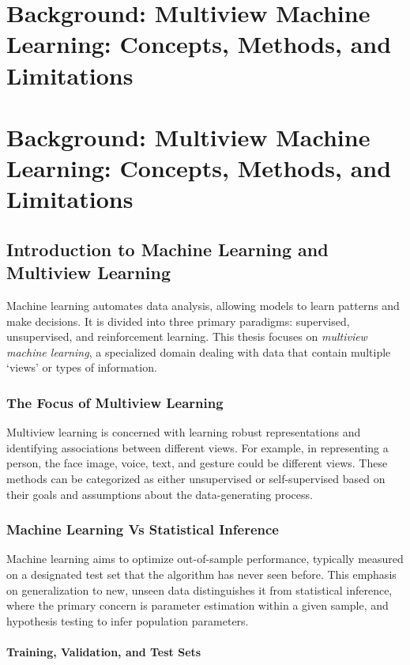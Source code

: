 \chapter{Background: Multiview Machine Learning: Concepts, Methods, and Limitations}
\label{chap:background}
\minitoc

\chapter{Background: Multiview Machine Learning: Concepts, Methods, and Limitations}
\label{chap:background}
\minitoc

\section{Introduction to Machine Learning and Multiview Learning}

Machine learning automates data analysis, allowing models to learn patterns and make decisions. It is divided into three primary paradigms: supervised, unsupervised, and reinforcement learning. This thesis focuses on \textit{multiview machine learning}, a specialized domain dealing with data that contain multiple `views' or types of information. 

\subsection{The Focus of Multiview Learning}

Multiview learning is concerned with learning robust representations and identifying associations between different views. For example, in representing a person, the face image, voice, text, and gesture could be different views. These methods can be categorized as either unsupervised or self-supervised based on their goals and assumptions about the data-generating process.

\subsection{Machine Learning Vs Statistical Inference}
Machine learning aims to optimize out-of-sample performance, typically measured on a designated test set that the algorithm has never seen before. This emphasis on generalization to new, unseen data distinguishes it from statistical inference, where the primary concern is parameter estimation within a given sample, and hypothesis testing to infer population parameters.

\subsubsection{Training, Validation, and Test Sets}

